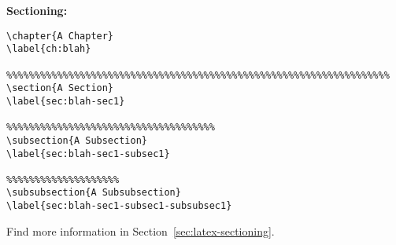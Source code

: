 \textbf{Sectioning:}

\begin{framed}
\begin{verbatim}
\chapter{A Chapter}
\label{ch:blah}

%%%%%%%%%%%%%%%%%%%%%%%%%%%%%%%%%%%%%%%%%%%%%%%%%%%%%%%%%%%%%%%%%%%%
\section{A Section}
\label{sec:blah-sec1}

%%%%%%%%%%%%%%%%%%%%%%%%%%%%%%%%%%%%%
\subsection{A Subsection}
\label{sec:blah-sec1-subsec1}

%%%%%%%%%%%%%%%%%%%%
\subsubsection{A Subsubsection}
\label{sec:blah-sec1-subsec1-subsubsec1}
\end{verbatim}
Find more information in Section~\ref{sec:latex-sectioning}.
\end{framed}
